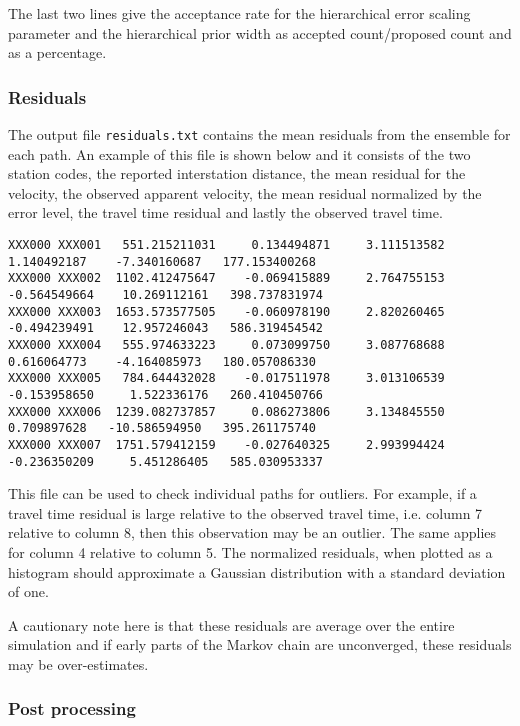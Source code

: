 \documentclass[a4paper,12pt]{article}
\begin{document}
The last two lines give the acceptance rate for the hierarchical error
scaling parameter and the hierarchical prior width as accepted
count/proposed count and as a percentage.

\subsubsection{Residuals}

The output file {\tt residuals.txt} contains the mean residuals from the
ensemble for each path. An example of this file is shown below and
it consists of the two station codes, the reported interstation
distance, the mean residual for the velocity, the observed apparent velocity,
the mean residual normalized by the error level, the travel time residual
and lastly the observed travel time.

\begin{flushleft}
  \tiny
\begin{verbatim}
XXX000 XXX001   551.215211031     0.134494871     3.111513582     1.140492187    -7.340160687   177.153400268
XXX000 XXX002  1102.412475647    -0.069415889     2.764755153    -0.564549664    10.269112161   398.737831974
XXX000 XXX003  1653.573577505    -0.060978190     2.820260465    -0.494239491    12.957246043   586.319454542
XXX000 XXX004   555.974633223     0.073099750     3.087768688     0.616064773    -4.164085973   180.057086330
XXX000 XXX005   784.644432028    -0.017511978     3.013106539    -0.153958650     1.522336176   260.410450766
XXX000 XXX006  1239.082737857     0.086273806     3.134845550     0.709897628   -10.586594950   395.261175740
XXX000 XXX007  1751.579412159    -0.027640325     2.993994424    -0.236350209     5.451286405   585.030953337
\end{verbatim}
\end{flushleft}

This file can be used to check individual paths for outliers. For example, if a travel time residual
is large relative to the observed travel time, i.e. column 7 relative to column 8, then this observation
may be an outlier. The same applies for column 4 relative to column 5. The normalized residuals, when
plotted as a histogram should approximate a Gaussian distribution with a standard deviation of one.

A cautionary note here is that these residuals are average over the entire simulation
and if early parts of the Markov chain are unconverged, these residuals may be over-estimates.

\subsubsection{Post processing}
\end{document}
